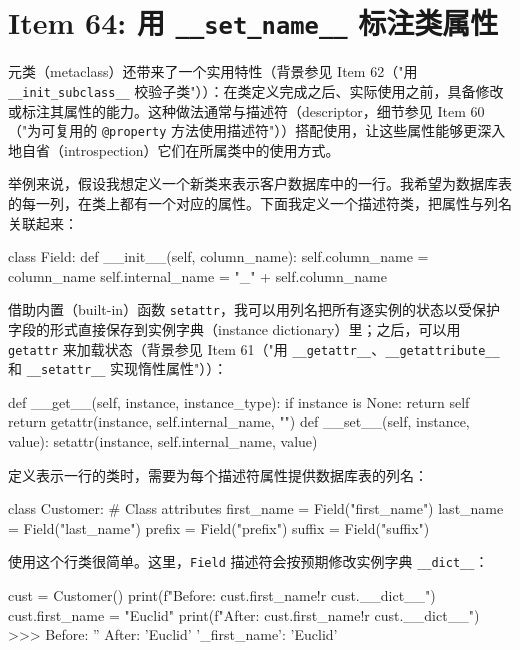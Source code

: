 \section{Item 64: 用 \texttt{\_\_set\_name\_\_} 标注类属性}

元类（metaclass）还带来了一个实用特性（背景参见 Item 62（"用 \texttt{\_\_init\_subclass\_\_} 校验子类"））：在类定义完成之后、实际使用之前，具备修改或标注其属性的能力。这种做法通常与描述符（descriptor，细节参见 Item 60（"为可复用的 \texttt{@property} 方法使用描述符"））搭配使用，让这些属性能够更深入地自省（introspection）它们在所属类中的使用方式。

举例来说，假设我想定义一个新类来表示客户数据库中的一行。我希望为数据库表的每一列，在类上都有一个对应的属性。下面我定义一个描述符类，把属性与列名关联起来：

\begin{codebox}[python]
class Field:
    def __init__(self, column_name):
        self.column_name = column_name
        self.internal_name = "_" + self.column_name
\end{codebox}

借助内置（built-in）函数 \texttt{setattr}，我可以用列名把所有逐实例的状态以受保护字段的形式直接保存到实例字典（instance dictionary）里；之后，可以用 \texttt{getattr} 来加载状态（背景参见 Item 61（"用 \texttt{\_\_getattr\_\_}、\texttt{\_\_getattribute\_\_} 和 \texttt{\_\_setattr\_\_} 实现惰性属性"））：

\begin{codebox}[python]
    def __get__(self, instance, instance_type):
        if instance is None:
            return self
        return getattr(instance, self.internal_name, "")
    def __set__(self, instance, value):
        setattr(instance, self.internal_name, value)
\end{codebox}

定义表示一行的类时，需要为每个描述符属性提供数据库表的列名：

\begin{codebox}[python]
class Customer:
    # Class attributes
    first_name = Field("first_name")
    last_name = Field("last_name")
    prefix = Field("prefix")
    suffix = Field("suffix")
\end{codebox}

使用这个行类很简单。这里，\texttt{Field} 描述符会按预期修改实例字典 \texttt{\_\_dict\_\_}：

\begin{codebox}[python]
cust = Customer()
print(f"Before: {cust.first_name!r} {cust.__dict__}")
cust.first_name = "Euclid"
print(f"After:  {cust.first_name!r} {cust.__dict__}")
>>>
Before: '' {}
After:  'Euclid' {'_first_name': 'Euclid'}
\end{codebox}

